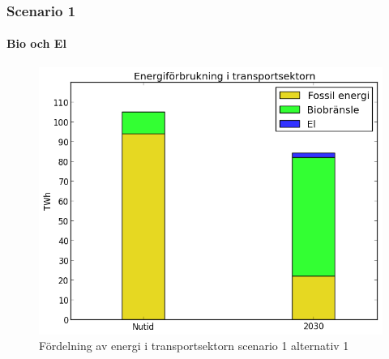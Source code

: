 \documentclass{beamer}
\begin{document}
\begin{frame}
	\frametitle{Scenario 1}
	\framesubtitle{Bio och El}
	\begin{figure}[h!]
       \centering
       \includegraphics[scale=0.5]{scen1a1transport.png}
       \caption{Fördelning av energi i transportsektorn scenario 1 alternativ 1}
	\end{figure}
\end{frame}
\end{document}
